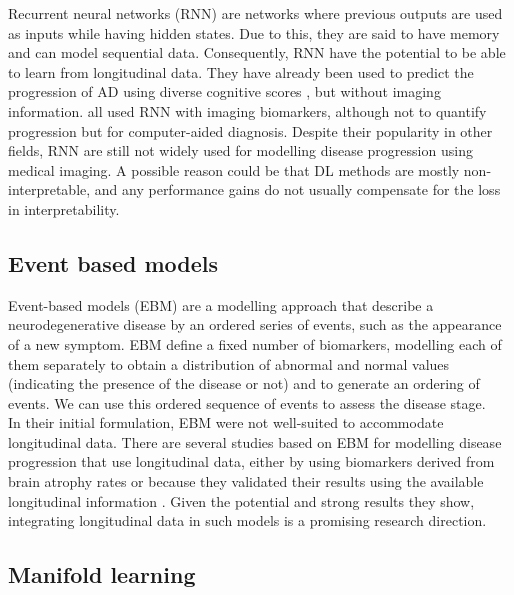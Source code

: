 Recurrent neural networks (RNN) are networks where previous outputs are used as inputs while having hidden states. Due to this, they are said to have memory and can model sequential data. Consequently, RNN have the potential to be able to learn from longitudinal data. They have already been used to predict the progression of AD using diverse cognitive scores \cite{Wang2018}, but without imaging information. \cite{Ghazi2019,Cui2018,Aghili2018} all used RNN with imaging biomarkers, although not to quantify progression but for computer-aided diagnosis. Despite their popularity in other fields, RNN are still not widely used for modelling disease progression using medical imaging. A possible reason could be that DL methods are mostly non-interpretable, and any performance gains do not usually compensate for the loss in interpretability. \\ 

\subsection{Event based models}

Event-based models (EBM) \cite{Fonteijn2012} are a modelling approach that describe a neurodegenerative disease by an ordered series of events, such as the appearance of a new symptom. EBM define a fixed number of biomarkers, modelling each of them separately to obtain a distribution of abnormal and normal values (indicating the presence of the disease or not) and to generate an ordering of events. We can use this ordered sequence of events to assess the disease stage. \\

In their initial formulation, EBM were not well-suited to accommodate longitudinal data. There are several studies based on EBM for modelling disease progression that use longitudinal data, either by using biomarkers derived from brain atrophy rates \cite{Fonteijn2012,Huang2012,Young2014} or because they validated their results using the available longitudinal information \cite{Oxtoby2018,Young2014}. Given the potential and strong results they show, integrating longitudinal data in such models is a promising research direction. \\

\subsection{Manifold learning}

